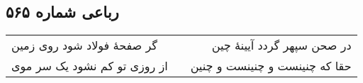 \begin{center}
\section*{رباعی شماره ۵۶۵}
\label{sec:sh565}
\begin{longtable}{l p{0.5cm} r}
گر صفحهٔ فولاد شود روی زمین
&&
در صحن سپهر گردد آیینهٔ چین
\\
از روزی تو کم نشود یک سر موی
&&
حقا که چنینست و چنینست و چنین
\\
\end{longtable}
\end{center}
